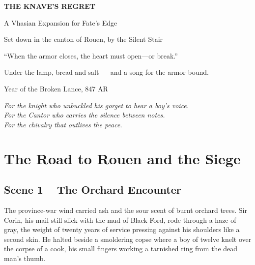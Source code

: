 \documentclass[11pt,twoside]{book}
\begin{document}
\begin{titlepage}
  \centering
  \vspace*{2cm}
  {\Huge\bfseries\color{fracture} THE KNAVE'S REGRET\par}
  \vspace{1cm}
  {\Large A Vhasian Expansion for Fate's Edge\par}
  \vspace{1.5cm}
  {\large Set down in the canton of Rouen, by the Silent Stair\par}
  \vspace{2cm}
  {\normalsize \textcolor{fracture}{``When the armor closes, the heart must open---or break.''}}\par
  \vspace{1cm}
  {\small Under the lamp, bread and salt --- and a song for the armor-bound.\par}
  \vfill
  {\normalsize Year of the Broken Lance, 847 AR\par}
\end{titlepage}
\restoregeometry

\newpage
\thispagestyle{empty}
\vspace*{\fill}
\begin{center}
  \emph{For the knight who unbuckled his gorget to hear a boy's voice.\\
  For the Cantor who carries the silence between notes.\\
  For the chivalry that outlives the peace.}
\end{center}
\vspace*{\fill}
\newpage

\chapter{The Road to Rouen and the Siege}

\section{Scene 1 -- The Orchard Encounter}
The province-war wind carried ash and the sour scent of burnt orchard trees.  Sir Corin, his mail still slick with the mud of Black Ford, rode through a haze of gray, the weight of twenty years of service pressing against his shoulders like a second skin.  He halted beside a smoldering copse where a boy of twelve knelt over the corpse of a cook, his small fingers working a tarnished ring from the dead man's thumb.
\end{document}
